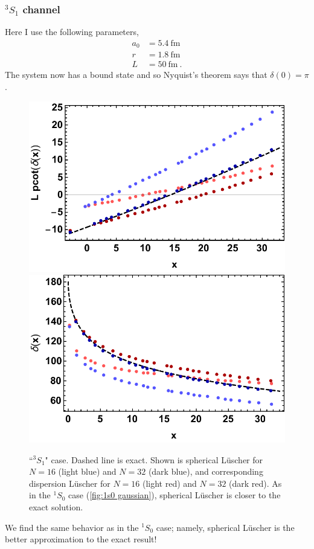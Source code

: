 \documentclass[11pt]{article}
\begin{document}
\subsubsection{$^3S_1$ channel}
Here I use the following parameters,
\begin{align*}
a_0&=5.4\ \mathrm{ fm}\\
r&=1.8\ \mathrm{ fm}\\
L&=50\ \mathrm{ fm}\ .
\end{align*}
The system now has a bound state and so Nyquist's theorem says that $\delta(0)=\pi$.
\begin{figure}
\includegraphics[width=.5\textwidth]{figs/pcotd_3S1_gaussian.pdf}\includegraphics[width=.5\textwidth]{figs/delta_3S1_gaussian.pdf}
\caption{``$^3S_1$" case.  Dashed line is exact.  Shown is spherical L\"uscher for $N=16$ (light blue) and $N=32$ (dark blue), and corresponding dispersion L\"uscher for $N=16$ (light red) and $N=32$ (dark red). As in the $^1S_0$ case (\autoref{fig:1s0 gaussian}), spherical L\"uscher is closer to the exact solution. \label{fig:3s1 gaussian} }
\end{figure}
We find the same behavior as in the $^1S_0$ case; namely, spherical L\"uscher is the better approximation to the exact result!
\end{document}
